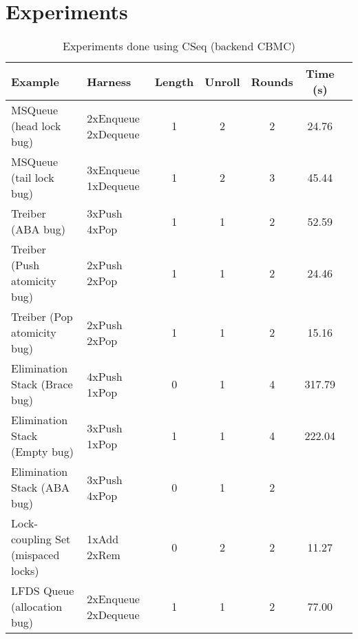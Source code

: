 \section{Experiments} 

\newcommand{\free}{free}
\newcommand{\ababug}{ABA bug}
\newcommand{\Pushm}{Push}
\newcommand{\Popm}{Pop}
\newcommand{\Removem}{Remove}
\newcommand{\Enqueuem}{Enqueue}
\newcommand{\Dequeuem}{Dequeue}
\newcommand{\unlock}{unlock}
\newcommand{\emptybug}{Empty bug}
\newcommand{\bracebug}{Brace bug}


\begin{table*}
\begin{tabular}{l|l|c|c|c|c|c}
Example                             & Harness             & Length & Unroll  & Rounds  & Time (s)  \\\hline
MSQueue (head lock bug)             & 2xEnqueue 2xDequeue & 1       & 2       & 2       &      24.76    \\
MSQueue (tail lock bug)             & 3xEnqueue 1xDequeue & 1       & 2       & 3       &     45.44     \\
Treiber (\ababug{})                 & 3xPush    4xPop     &  1       & 1       & 2       &      52.59     \\
Treiber (Push atomicity bug)        & 2xPush    2xPop     & 1       & 1       & 2       &     24.46    \\
Treiber (Pop atomicity bug)         & 2xPush    2xPop     & 1       & 1       & 2       &    15.16     \\
Elimination Stack (\bracebug)       & 4xPush    1xPop     & 0       & 1       & 4       &    317.79        \\
Elimination Stack (\emptybug)       & 3xPush    1xPop     & 1       & 1       & 4       &    222.04       \\
Elimination Stack (\ababug{})       & 3xPush    4xPop     & 0       & 1       & 2       &            \\
Lock-coupling Set (mispaced locks)  & 1xAdd     2xRem     & 0       & 2       & 2       &  11.27        \\
LFDS Queue (allocation bug)         & 2xEnqueue 2xDequeue & 1       & 1       & 2       &      77.00   
\end{tabular} 
\caption{Experiments done using CSeq (backend CBMC)}
\label{tab:exp-static}
\end{table*}

